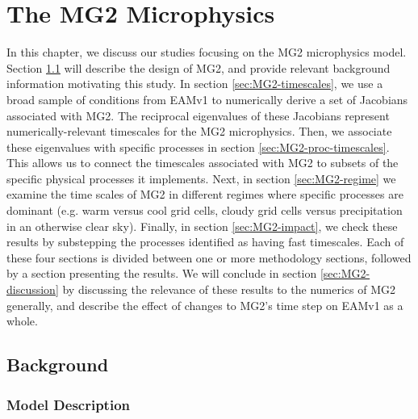 \documentclass [11pt, proquest] {uwthesis}[2020/02/24]
\begin{document}
\chapter{The MG2 Microphysics} \label{ch:MG2}

In this chapter, we discuss our studies focusing on the MG2 microphysics model. Section \ref{sec:MG2-background} will describe the design of MG2, and provide relevant background information motivating this study. In section \ref{sec:MG2-timescales}, we use a broad sample of conditions from EAMv1 to numerically derive a set of Jacobians associated with MG2. The reciprocal eigenvalues of these Jacobians represent numerically-relevant timescales for the MG2 microphysics. Then, we associate these eigenvalues with specific processes in section \ref{sec:MG2-proc-timescales}. This allows us to connect the timescales associated with MG2 to subsets of the specific physical processes it implements. Next, in section \ref{sec:MG2-regime} we examine the time scales of MG2 in different regimes where specific processes are dominant (e.g. warm versus cool grid cells, cloudy grid cells versus precipitation in an otherwise clear sky). Finally, in section \ref{sec:MG2-impact}, we check these results by substepping the processes identified as having fast timescales. Each of these four sections is divided between one or more methodology sections, followed by a section presenting the results. We will conclude in section \ref{sec:MG2-discussion} by discussing the relevance of these results to the numerics of MG2 generally, and describe the effect of changes to MG2's time step on EAMv1 as a whole.

\section{Background} \label{sec:MG2-background}

\subsection{Model Description}
\end{document}
